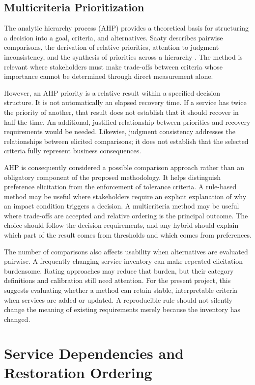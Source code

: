 \subsection{Multicriteria Prioritization}

The analytic hierarchy process (AHP) provides a theoretical basis for structuring a decision into a goal, criteria, and alternatives. Saaty describes pairwise comparisons, the derivation of relative priorities, attention to judgment inconsistency, and the synthesis of priorities across a hierarchy \cite{saaty2008ahp}. The method is relevant where stakeholders must make trade-offs between criteria whose importance cannot be determined through direct measurement alone.

However, an AHP priority is a relative result within a specified decision structure. It is not automatically an elapsed recovery time. If a service has twice the priority of another, that result does not establish that it should recover in half the time. An additional, justified relationship between priorities and recovery requirements would be needed. Likewise, judgment consistency addresses the relationships between elicited comparisons; it does not establish that the selected criteria fully represent business consequences.

AHP is consequently considered a possible comparison approach rather than an obligatory component of the proposed methodology. It helps distinguish preference elicitation from the enforcement of tolerance criteria. A rule-based method may be useful where stakeholders require an explicit explanation of why an impact condition triggers a decision. A multicriteria method may be useful where trade-offs are accepted and relative ordering is the principal outcome. The choice should follow the decision requirements, and any hybrid should explain which part of the result comes from thresholds and which comes from preferences.

The number of comparisons also affects usability when alternatives are evaluated pairwise. A frequently changing service inventory can make repeated elicitation burdensome. Rating approaches may reduce that burden, but their category definitions and calibration still need attention. For the present project, this suggests evaluating whether a method can retain stable, interpretable criteria when services are added or updated. A reproducible rule should not silently change the meaning of existing requirements merely because the inventory has changed.

\section{Service Dependencies and Restoration Ordering}

